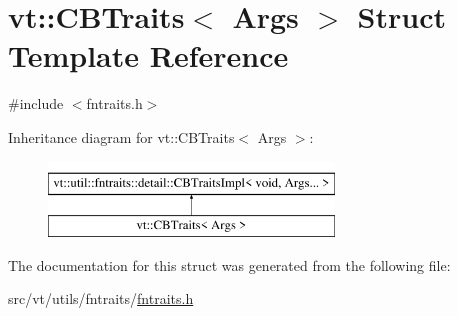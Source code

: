 \hypertarget{structvt_1_1_c_b_traits}{}\section{vt\+:\+:C\+B\+Traits$<$ Args $>$ Struct Template Reference}
\label{structvt_1_1_c_b_traits}


{\ttfamily \#include $<$fntraits.\+h$>$}

Inheritance diagram for vt\+:\+:C\+B\+Traits$<$ Args $>$\+:\begin{figure}[H]
\begin{center}
\leavevmode
\includegraphics[height=2.000000cm]{structvt_1_1_c_b_traits}
\end{center}
\end{figure}


The documentation for this struct was generated from the following file\+:\begin{DoxyCompactItemize}
\item 
src/vt/utils/fntraits/\hyperlink{fntraits_8h}{fntraits.\+h}\end{DoxyCompactItemize}
